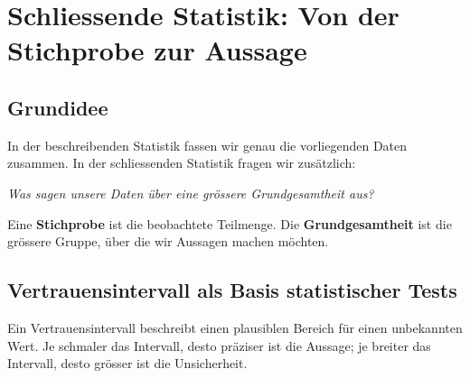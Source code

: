 \section{Schliessende Statistik: Von der Stichprobe zur Aussage}

\subsection{Grundidee}
In der beschreibenden Statistik fassen wir genau die vorliegenden Daten zusammen.
In der schliessenden Statistik fragen wir zusätzlich:
\begin{center}
	\textit{Was sagen unsere Daten über eine grössere Grundgesamtheit aus?}
\end{center}

\begin{mydefinition}
	Eine \textbf{Stichprobe} ist die beobachtete Teilmenge.
	Die \textbf{Grundgesamtheit} ist die grössere Gruppe, über die wir Aussagen machen möchten.
\end{mydefinition}

\subsection{Vertrauensintervall als Basis statistischer Tests}

\begin{myremark}
	Ein Vertrauensintervall beschreibt einen plausiblen Bereich für einen unbekannten Wert.
	Je schmaler das Intervall, desto präziser ist die Aussage; je breiter das Intervall, desto grösser ist die Unsicherheit.
\end{myremark}

